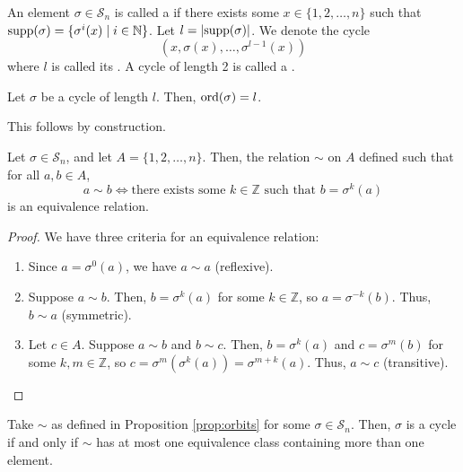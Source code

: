 \begin{defn}
An element $ \sigma\in\mathcal{S}_n $ is called a  if there exists some $ x\in\{1,2,\ldots,n\} $ such that $ \operatorname{supp}(\sigma)=\{\sigma^i(x)\mid i\in\mathbb{N}\} $. Let $ l=\lvert\operatorname{supp}(\sigma)\rvert $. We denote the cycle
\begin{equation*}
    \left(x,\sigma(x),\ldots,\sigma^{l-1}(x)\right)
\end{equation*}
where $ l $ is called its . A cycle of length 2 is called a .
\end{defn}

\begin{prop}
Let $ \sigma $ be a cycle of length $ l $. Then, $ \operatorname{ord}(\sigma)=l $.
\end{prop}

This follows by construction.

\begin{prop}\label{prop:orbits}
Let $ \sigma\in\mathcal{S}_n $, and let $ A=\{1,2,\ldots,n\} $. Then, the relation $ \sim $ on $ A $ defined such that for all $ a,b\in A $,
\begin{equation*}
    a\sim b \iff \text{there exists some }k\in\mathbb{Z}\text{ such that }b=\sigma^k(a)
\end{equation*}
is an equivalence relation.
\end{prop}
\begin{proof}
We have three criteria for an equivalence relation:
\begin{enumerate}
    \item Since $ a=\sigma^0(a) $, we have $ a\sim a $ (reflexive).
    \item Suppose $ a\sim b $. Then, $ b=\sigma^k(a) $ for some $ k\in\mathbb{Z} $, so $ a=\sigma^{-k}(b) $. Thus, $ b\sim a $ (symmetric).
    \item Let $ c\in A $. Suppose $ a\sim b $ and $ b\sim c $. Then, $ b=\sigma^k(a) $ and $ c=\sigma^m(b) $ for some $ k,m\in\mathbb{Z} $, so $ c=\sigma^m(\sigma^k(a))=\sigma^{m+k}(a) $. Thus, $ a\sim c $ (transitive).\qedhere
\end{enumerate}
\end{proof}

\begin{cor}
Take $ \sim $ as defined in Proposition \ref{prop:orbits} for some $ \sigma\in\mathcal{S}_n $. Then, $ \sigma $ is a cycle if and only if $ \sim $ has at most one equivalence class containing more than one element.
\end{cor}

